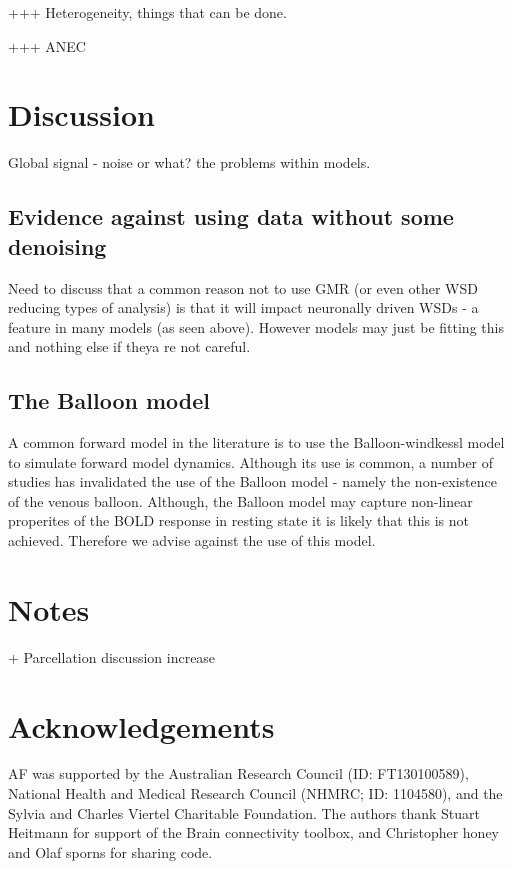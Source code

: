 \documentclass[oneside]{zHenriquesLab-StyleBioRxiv}
\begin{document}


+++ Heterogeneity, things that can be done.

+++ ANEC 



\section*{Discussion}
Global signal - noise or what? the problems within models. 

\subsection*{Evidence against using data without some denoising} 
Need to discuss that a common reason not to use GMR (or even other WSD reducing types of analysis) is that it will impact neuronally driven WSDs - a feature in many models (as seen above). However models may just be fitting this and nothing else if theya re not careful. 

\subsection*{The Balloon model} 

A common forward model in the literature is to use the Balloon-windkessl model to simulate forward model dynamics. Although its use is common, a number of studies has invalidated the use of the Balloon model - namely the non-existence of the venous balloon. Although, the Balloon model may capture non-linear properites of the BOLD response in resting state it is likely that this is not achieved. Therefore we advise against the use of this model. 

\section*{Notes}
+ Parcellation discussion increase

\section*{Acknowledgements}


\begin{acknowledgements}
AF was supported by the Australian Research Council (ID: FT130100589), National Health and Medical Research Council (NHMRC; ID: 1104580), and the Sylvia and Charles Viertel Charitable Foundation. The authors thank Stuart Heitmann for support of the Brain connectivity toolbox, and Christopher honey and Olaf sporns for sharing code. 
\end{acknowledgements}
\end{document}
